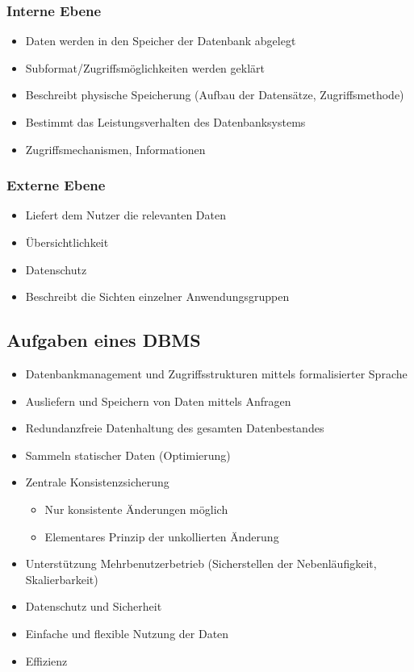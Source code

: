 \subsubsection{Interne Ebene}
\begin{itemize}
  \item Daten werden in den Speicher der Datenbank abgelegt
  \item Subformat\slash{}Zugriffsmöglichkeiten werden geklärt
  \item Beschreibt physische Speicherung (Aufbau der Datensätze, Zugriffsmethode)
  \item Bestimmt das Leistungsverhalten des Datenbanksystems
  \item Zugriffsmechanismen, Informationen
\end{itemize}

\subsubsection{Externe Ebene}
\begin{itemize}
  \item Liefert dem Nutzer die relevanten Daten
  \item Übersichtlichkeit
  \item Datenschutz
  \item Beschreibt die Sichten einzelner Anwendungsgruppen
\end{itemize}

\subsection{Aufgaben eines DBMS}
\begin{itemize}
  \item Datenbankmanagement und Zugriffsstrukturen mittels formalisierter Sprache
  \item Ausliefern und Speichern von Daten mittels Anfragen
  \item Redundanzfreie Datenhaltung des gesamten Datenbestandes
  \item Sammeln statischer Daten (Optimierung)
  \item Zentrale Konsistenzsicherung
	\begin{itemize}
	  \item Nur konsistente Änderungen möglich
	  \item Elementares Prinzip der unkollierten Änderung
	\end{itemize}
  \item Unterstützung Mehrbenutzerbetrieb (Sicherstellen der Nebenläufigkeit, Skalierbarkeit)
  \item Datenschutz und Sicherheit
  \item Einfache und flexible Nutzung der Daten
  \item Effizienz
\end{itemize}

